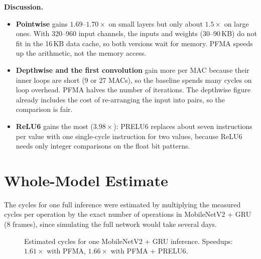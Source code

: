 \textbf{Discussion.}
\begin{itemize}
  \item \textbf{Pointwise} gains $1.69$--$1.70\times$ on small layers but only
        about $1.5\times$ on large ones. With 320--960 input channels, the
        inputs and weights (30--90\,KB) do not fit in the 16\,KB data cache,
        so both versions wait for memory. PFMA speeds up the arithmetic, not
        the memory access.
  \item \textbf{Depthwise and the first convolution} gain more per MAC because
        their inner loops are short (9 or 27 MACs), so the baseline spends
        many cycles on loop overhead. PFMA halves the number of iterations.
        The depthwise figure already includes the cost of re-arranging the
        input into pairs, so the comparison is fair.
  \item \textbf{ReLU6} gains the most ($3.98\times$): PRELU6 replaces about
        seven instructions per value with one single-cycle instruction for
        two values, because ReLU6 needs only integer comparisons on the float
        bit patterns.
\end{itemize}

\section{Whole-Model Estimate}

The cycles for one full inference were estimated by multiplying the measured
cycles per operation by the exact number of operations in MobileNetV2 + GRU
(8 frames), since simulating the full network would take several days.

\begin{figure}[h]
\centering
{}
\caption{Estimated cycles for one MobileNetV2 + GRU inference.
Speedups: $1.61\times$ with PFMA, $1.66\times$ with PFMA + PRELU6.}
\label{fig:whole}
\end{figure}

